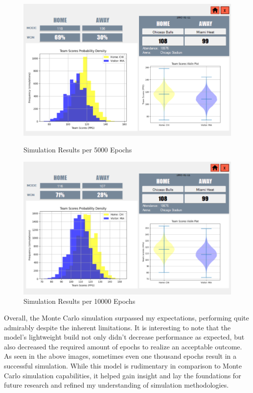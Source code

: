 \documentclass{thesis-ekf}
\theoremstyle{definition}
\theoremstyle{remark}
\begin{document}
\begin{figure}[H]
	\begin{minipage}{0.48\textwidth}
		\centering
		\includegraphics[width=\textwidth]{img/results/chi_mia_5000}
		\caption{Simulation Results per 5000 Epochs}
		\label{img-results-5000}
	\end{minipage}
	\hfill
	\begin{minipage}{0.48\textwidth}
		\centering
		\includegraphics[width=\textwidth]{img/results/chi_mia_10000}
		\caption{Simulation Results per 10000 Epochs}
		\label{img-results-10000}
	\end{minipage}
\end{figure}

Overall, the Monte Carlo simulation surpassed my expectations, performing quite admirably despite the inherent limitations. It is interesting to note that the model's lightweight build not only didn't decrease performance as expected, but also decreased the required amount of epochs to realize an acceptable outcome. As seen in the above images, sometimes even one thousand epochs result in a successful simulation. While this model is rudimentary in comparison to Monte Carlo simulation capabilities, it helped gain insight and lay the foundations for future research and refined my understanding of simulation methodologies.
\end{document}
